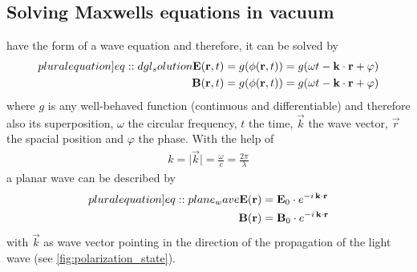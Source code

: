 \subsection{Solving Maxwells equations in vacuum}\label{sec::SolvMaxEqVac}
%
 have the form of a wave equation and therefore, it can be solved by
%
\begin{align}
\begin{split} \label[pluralequation]{eq::dgl_solution}
  \vec{E}( \vec{r}, t ) &= g(\phi( \vec{r}, t )) = g( \omega t - \vec{k} \cdot \vec{r} + \varphi)\\
  \vec{B}( \vec{r}, t ) &= g(\phi( \vec{r}, t )) = g( \omega t - \vec{k} \cdot \vec{r} + \varphi )
\end{split}
\end{align}
%
where $g$ is any well-behaved function (continuous and differentiable) and therefore also its superposition, $\omega$ the circular frequency, $t$ the time, $\vec{k}$ the wave vector, $\vec{r}$ the spacial position and $\varphi$ the phase.
%
With the help of
%
\begin{align}
k = \mathopen| \vec{k} \mathclose| = \frac{\omega}{c} =  \frac{2 \pi}{\lambda}
\end{align}
%
a planar wave can be described by
%
\begin{align}
\begin{split} \label[pluralequation]{eq::plane_wave}
\vec{E}(\vec{r}) &= \vec{E}_0 \cdot e^{ -i \, \vec{k} \cdot \vec{r} }\\
 \vec{B}(\vec{r}) &= \vec{B}_0 \cdot e^{ -i \, \vec{k} \cdot \vec{r} }
\end{split}
\end{align}
%
with $\vec{k}$ as wave vector pointing in the direction of the propagation of the light wave (see \cref{fig:polarization_state}).
%
%

